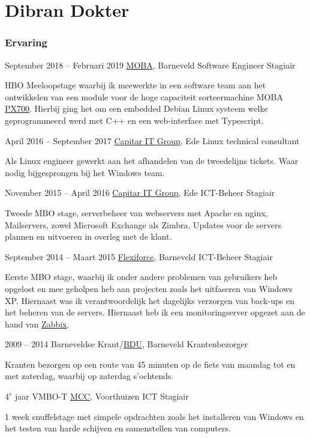 \documentclass{tccv}
\begin{document}
\part{Dibran Dokter}

\section{Ervaring}

\begin{eventlist}
	
\item{September 2018 -- Februari 2019}
	 {\href{https://www.moba.net/page/en/}{MOBA}, Barneveld}
	 {Software Engineer Stagiair}

HBO Meeloopstage waarbij ik meewerkte in een software team aan het ontwikkelen van een module voor de hoge capaciteit sorteermachine MOBA \href{https://www.moba.net/page/en/Products/Detail/omnia-px/5}{PX700}. Hierbij ging het om een embedded Debian Linux systeem welke geprogrammeerd werd met C++ en een web-interface met Typescript.
	
\item{April 2016 -- September 2017}
     {\href{https://www.capitar.com/}{Capitar IT Group}, Ede}
     {Linux technical consultant}

Als Linux engineer gewerkt aan het afhandelen van de tweedelijns tickets. Waar nodig bijgesprongen bij het Windows team.


\item{November 2015 -- April 2016}
     {\href{https://www.capitar.com/}{Capitar IT Group}, Ede}
     {ICT-Beheer Stagiair}
     
Tweede MBO stage, serverbeheer van webservers met Apache en nginx, Mailservers, zowel Microsoft Exchange als Zimbra. Updates voor de servers plannen en uitvoeren in overleg met de klant. 

\item{September 2014 -- Maart 2015}
     {\href{https://www.flexiforce.com/nl/}{Flexiforce}, Barneveld}
     {ICT-Beheer Stagiair}

Eerste MBO stage, waarbij ik onder andere problemen van gebruikers heb opgelost en mee geholpen heb aan projecten zoals het uitfaseren van Windows XP. Hiernaast was ik verantwoordelijk het dagelijks verzorgen van back-ups en het beheren van de servers. Hiernaast heb ik een monitoringserver opgezet aan de hand van \href{https://www.zabbix.com/}{Zabbix}.

\item{2009 -- 2014}
     {Barneveldse Krant/\href{http://www.bdu.nl/}{BDU}, Barneveld}
     {Krantenbezorger}

Kranten bezorgen op een route van 45 minuten op de fiets van maandag tot en met zaterdag, waarbij op zaterdag s'ochtends.

\item{$4^{e}$ jaar VMBO-T}
     {\href{https://www.mcc.nu/}{MCC}, Voorthuizen}
     {ICT Stagiair}

1 week snuffelstage met simpele opdrachten zoals het installeren van Windows en
het testen van harde schijven en samenstellen van computers.

\end{eventlist}
\end{document}
